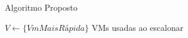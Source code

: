 \documentclass[final]{beamer}
\begin{document}
\begin{frame}[t]
\begin{columns}[t] 
\begin{column}{0.35\paperwidth}

	\begin{block}{Algoritmo Proposto}
	\begin{codebox}
		\li $V \gets \{VmMaisRápida\}$ \Comment VMs usadas ao escalonar
%	   
%		   
%		   
%		       
%		   
	\End
	\end{codebox}
	
	
	\end{block}
	

\end{column}
\end{columns}
\end{frame}
\end{document}
